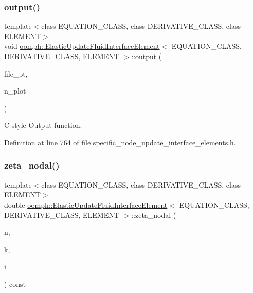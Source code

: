 \subsubsection{\texorpdfstring{output()}{output()}\hspace{0.1cm}{\footnotesize\ttfamily [4/4]}}
{\footnotesize\ttfamily template$<$class E\+Q\+U\+A\+T\+I\+O\+N\+\_\+\+C\+L\+A\+SS, class D\+E\+R\+I\+V\+A\+T\+I\+V\+E\+\_\+\+C\+L\+A\+SS, class E\+L\+E\+M\+E\+NT$>$ \\
void \hyperlink{classoomph_1_1ElasticUpdateFluidInterfaceElement}{oomph\+::\+Elastic\+Update\+Fluid\+Interface\+Element}$<$ E\+Q\+U\+A\+T\+I\+O\+N\+\_\+\+C\+L\+A\+SS, D\+E\+R\+I\+V\+A\+T\+I\+V\+E\+\_\+\+C\+L\+A\+SS, E\+L\+E\+M\+E\+NT $>$\+::output (\begin{DoxyParamCaption}\item[{F\+I\+LE $\ast$}]{file\+\_\+pt,  }\item[{const unsigned \&}]{n\+\_\+plot }\end{DoxyParamCaption})\hspace{0.3cm}{\ttfamily [inline]}}



C-\/style Output function. 



Definition at line 764 of file specific\+\_\+node\+\_\+update\+\_\+interface\+\_\+elements.\+h.

\mbox{\label{classoomph_1_1ElasticUpdateFluidInterfaceElement_a41706192ce4de3c4c51a70086199d8fa}} 
\subsubsection{\texorpdfstring{zeta\+\_\+nodal()}{zeta\_nodal()}}
{\footnotesize\ttfamily template$<$class E\+Q\+U\+A\+T\+I\+O\+N\+\_\+\+C\+L\+A\+SS, class D\+E\+R\+I\+V\+A\+T\+I\+V\+E\+\_\+\+C\+L\+A\+SS, class E\+L\+E\+M\+E\+NT$>$ \\
double \hyperlink{classoomph_1_1ElasticUpdateFluidInterfaceElement}{oomph\+::\+Elastic\+Update\+Fluid\+Interface\+Element}$<$ E\+Q\+U\+A\+T\+I\+O\+N\+\_\+\+C\+L\+A\+SS, D\+E\+R\+I\+V\+A\+T\+I\+V\+E\+\_\+\+C\+L\+A\+SS, E\+L\+E\+M\+E\+NT $>$\+::zeta\+\_\+nodal (\begin{DoxyParamCaption}\item[{const unsigned \&}]{n,  }\item[{const unsigned \&}]{k,  }\item[{const unsigned \&}]{i }\end{DoxyParamCaption}) const\hspace{0.3cm}{\ttfamily [inline]}}




